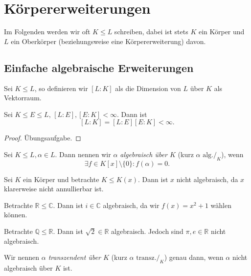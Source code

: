 \section{Körpererweiterungen}

Im Folgenden werden wir oft $K \leq L$ schreiben, dabei ist stets $K$ ein Körper und $L$ ein Oberkörper (beziehungsweise eine Körpererweiterung) davon.

\subsection{Einfache algebraische Erweiterungen}

\begin{definition}
    Sei $K \leq L$, so definieren wir $[L:K]$ als die Dimension von $L$ über $K$ als Vektorraum.
\end{definition}

\begin{theorem}[Gradsatz]
    Sei $K \leq E \leq L$, $[L:E],[E:K] < \infty$. Dann ist
    $$ [L:K] = [L:E] [E:K] < \infty. $$
\end{theorem}

\begin{proof}
    Übungsaufgabe.
\end{proof}

\begin{definition}
    Sei $K \leq L, \alpha \in L$. Dann nennen wir \emph{$\alpha$ algebraisch über $K$} (kurz $\alpha \text{ alg.}/_K$), wenn
    $$ \exists f \in K[x] \setminus \{0\}: f(\alpha) = 0. $$
\end{definition}

\begin{example}
    Sei $K$ ein Körper und betrachte $K \leq K(x)$. Dann ist $x$ nicht algebraisch, da $x$ klarerweise nicht annullierbar ist.
\end{example}

\begin{example}
    Betrachte $\mathbb{R} \leq \mathbb{C}$. Dann ist $i \in \mathbb{C}$ algebraisch, da wir $f(x) = x^2 + 1$ wählen können.
\end{example}

\begin{example}
    Betrachte $\mathbb{Q} \leq \mathbb{R}$. Dann ist $\sqrt{2} \in \mathbb{R}$ algebraisch. Jedoch sind $\pi, e \in \mathbb{R}$ nicht algebraisch.
\end{example}

\begin{definition}
    Wir nennen \emph{$\alpha$ transzendent über $K$} (kurz $\alpha \text { transz.}/_K$) genau dann, wenn $\alpha$ nicht algebraisch über $K$ ist.
\end{definition}

